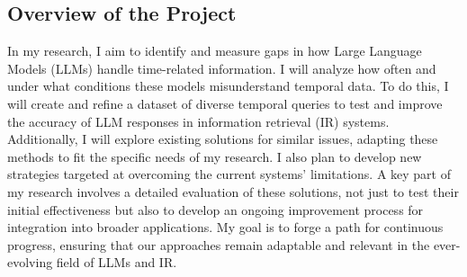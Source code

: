 \subsection{Overview of the Project}

In my research, I aim to identify and measure gaps in how Large Language Models (LLMs) handle time-related information. I will analyze how often and under what conditions these models misunderstand temporal data. To do this, I will create and refine a dataset of diverse temporal queries to test and improve the accuracy of LLM responses in information retrieval (IR) systems. Additionally, I will explore existing solutions for similar issues, adapting these methods to fit the specific needs of my research. I also plan to develop new strategies targeted at overcoming the current systems' limitations. A key part of my research involves a detailed evaluation of these solutions, not just to test their initial effectiveness but also to develop an ongoing improvement process for integration into broader applications. My goal is to forge a path for continuous progress, ensuring that our approaches remain adaptable and relevant in the ever-evolving field of LLMs and IR.